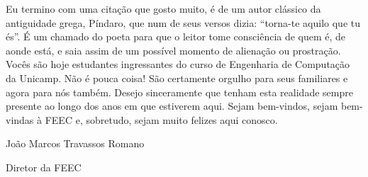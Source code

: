 Eu termino com uma citação que gosto muito, é de um autor clássico da
antiguidade grega, Píndaro, que num de seus versos dizia: ``torna-te aquilo que
tu és''. É um chamado do poeta para que o leitor tome consciência de quem é, de
aonde está, e saia assim de um possível momento de alienação ou prostração.
Vocês são hoje estudantes ingressantes do curso de Engenharia de Computação da
Unicamp. Não é pouca coisa! São certamente orgulho para seus familiares e agora
para nós também. Desejo sinceramente que tenham esta realidade sempre presente
ao longo dos anos em que estiverem aqui. Sejam bem-vindos, sejam bem-vindas à
FEEC e, sobretudo, sejam muito felizes aqui conosco.\\

\begin{flushright}
João Marcos Travassos Romano

Diretor da FEEC
\end{flushright}
